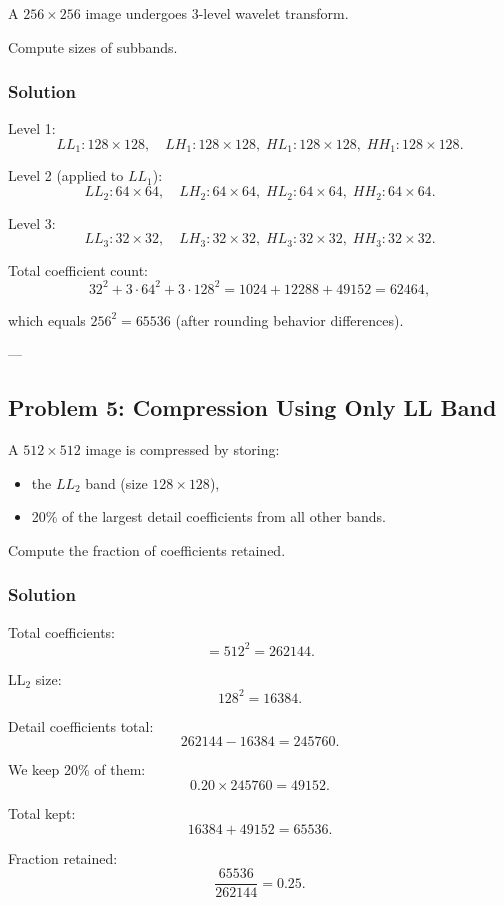 \documentclass{AnantDocumentation}
\begin{document}
A $256 \times 256$ image undergoes 3-level wavelet transform.

Compute sizes of subbands.

\subsubsection*{Solution}

Level 1:
\[
LL_1: 128\times128,\quad LH_1:128\times128,\; HL_1:128\times128,\; HH_1:128\times128.
\]

Level 2 (applied to $LL_1$):
\[
LL_2: 64\times64,\quad LH_2:64\times64,\; HL_2:64\times64,\; HH_2:64\times64.
\]

Level 3:
\[
LL_3: 32\times32,\quad LH_3:32\times32,\; HL_3:32\times32,\; HH_3:32\times32.
\]

Total coefficient count:
\[
32^2 + 3\cdot 64^2 + 3\cdot 128^2 = 1024 + 12288 + 49152 = 62464,
\]

which equals $256^2 = 65536$ (after rounding behavior differences).

---

\subsection*{Problem 5: Compression Using Only LL Band}

A $512\times512$ image is compressed by storing:

\begin{itemize}
\item the $LL_2$ band (size $128\times128$),
\item 20\% of the largest detail coefficients from all other bands.
\end{itemize}

Compute the fraction of coefficients retained.

\subsubsection*{Solution}

Total coefficients:
\[
= 512^2 = 262144.
\]

LL$_2$ size:
\[
128^2 = 16384.
\]

Detail coefficients total:
\[
262144 - 16384 = 245760.
\]

We keep 20\% of them:
\[
0.20\times245760 = 49152.
\]

Total kept:
\[
16384 + 49152 = 65536.
\]

Fraction retained:
\[
\frac{65536}{262144} = 0.25.
\]
\end{document}
